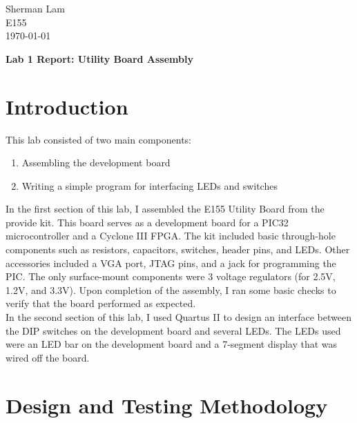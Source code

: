 \documentclass[11pt]{article}
\begin{document}
\begin{flushleft}
Sherman Lam
\\E155
\\ \today
\end{flushleft}


\begin{center}
\begin{Large}
\textbf{Lab 1 Report: Utility Board Assembly}
\end{Large}
\end{center}




\section{Introduction}
\label{sec:intro}

This lab consisted of two main components: 
	\begin{enumerate} \itemsep0pt
		\item Assembling the development board
		\item Writing a simple program for interfacing LEDs and switches
	\end{enumerate}

In the first section of this lab, I assembled the E155 Utility Board from the provide kit. This board serves as a development board for a PIC32 microcontroller and a Cyclone III FPGA. The kit included basic through-hole components such as resistors, capacitors, switches, header pins, and LEDs. Other accessories included a VGA port, JTAG pins, and a jack for programming the PIC. The only surface-mount components were 3 voltage regulators (for 2.5V, 1.2V, and 3.3V). Upon completion of the assembly, I ran some basic checks to verify that the board performed as expected. \\

In the second section of this lab, I used Quartus II to design an interface between the DIP switches on the development board and several LEDs. The LEDs used were an LED bar on the development board and a 7-segment display that was wired off the board.


\section{Design and Testing Methodology}
\end{document}
